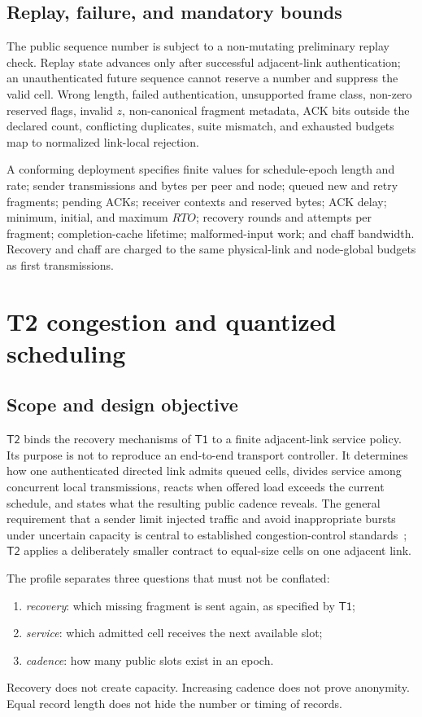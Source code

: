 \documentclass[11pt,oneside]{article}
\newcommand{\Tone}{\ensuremath{\mathsf{T1}}}
\newcommand{\Ttwo}{\ensuremath{\mathsf{T2}}}
\begin{document}
\subsection{Replay, failure, and mandatory bounds}

The public sequence number is subject to a non-mutating preliminary replay check. Replay state advances only after successful adjacent-link authentication; an unauthenticated future sequence cannot reserve a number and suppress the valid cell. Wrong length, failed authentication, unsupported frame class, non-zero reserved flags, invalid $z$, non-canonical fragment metadata, ACK bits outside the declared count, conflicting duplicates, suite mismatch, and exhausted budgets map to normalized link-local rejection.

A conforming deployment specifies finite values for schedule-epoch length and rate; sender transmissions and bytes per peer and node; queued new and retry fragments; pending ACKs; receiver contexts and reserved bytes; ACK delay; minimum, initial, and maximum $RTO$; recovery rounds and attempts per fragment; completion-cache lifetime; malformed-input work; and chaff bandwidth. Recovery and chaff are charged to the same physical-link and node-global budgets as first transmissions.

\section{T2 congestion and quantized scheduling}
\label{sec:t2}

\subsection{Scope and design objective}

\Ttwo{} binds the recovery mechanisms of \Tone{} to a finite adjacent-link service policy. Its purpose is not to reproduce an end-to-end transport controller. It determines how one authenticated directed link admits queued cells, divides service among concurrent local transmissions, reacts when offered load exceeds the current schedule, and states what the resulting public cadence reveals. The general requirement that a sender limit injected traffic and avoid inappropriate bursts under uncertain capacity is central to established congestion-control standards~\cite{rfc5681,rfc9002}; \Ttwo{} applies a deliberately smaller contract to equal-size cells on one adjacent link.

The profile separates three questions that must not be conflated:
\begin{enumerate}
  \item \emph{recovery}: which missing fragment is sent again, as specified by \Tone{};
  \item \emph{service}: which admitted cell receives the next available slot;
  \item \emph{cadence}: how many public slots exist in an epoch.
\end{enumerate}
Recovery does not create capacity. Increasing cadence does not prove anonymity. Equal record length does not hide the number or timing of records.
\end{document}
